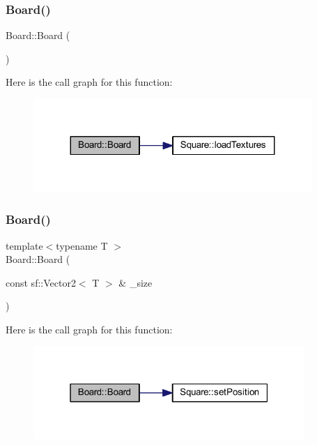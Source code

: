 \subsubsection{\texorpdfstring{Board()}{Board()}\hspace{0.1cm}{\footnotesize\ttfamily [1/3]}}
{\footnotesize\ttfamily Board\+::\+Board (\begin{DoxyParamCaption}{ }\end{DoxyParamCaption})}

Here is the call graph for this function\+:\nopagebreak
\begin{figure}[H]
\begin{center}
\leavevmode
\includegraphics[width=299pt]{class_board_a9ee491d4fea680cf69b033374a9fdfcb_cgraph}
\end{center}
\end{figure}
\mbox{\label{class_board_a3ab3bc5a15b6f8fb4aa8473fed2afdcb}} 
\subsubsection{\texorpdfstring{Board()}{Board()}\hspace{0.1cm}{\footnotesize\ttfamily [2/3]}}
{\footnotesize\ttfamily template$<$typename T $>$ \\
Board\+::\+Board (\begin{DoxyParamCaption}\item[{const sf\+::\+Vector2$<$ T $>$ \&}]{\+\_\+size }\end{DoxyParamCaption})}

Here is the call graph for this function\+:\nopagebreak
\begin{figure}[H]
\begin{center}
\leavevmode
\includegraphics[width=292pt]{class_board_a3ab3bc5a15b6f8fb4aa8473fed2afdcb_cgraph}
\end{center}
\end{figure}
\mbox{\label{class_board_abda1ce2449776e76715fc7b59c912935}} 
